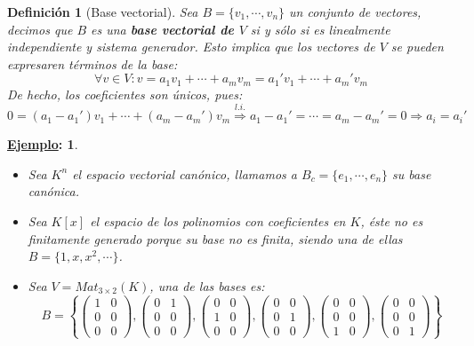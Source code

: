\documentclass[10pt,a4paper,openright]{book}
\theoremstyle{break}
\newtheorem*{defi}{Definición}
\newtheorem*{ej}{\underline{Ejemplo}:}
\begin{document}
\begin{defi}[Base vectorial]
Sea $B=\{v_1, \cdots , v_n\}$  un conjunto de vectores, decimos que $B$ es una \textbf{base vectorial de $V$} si y sólo si es linealmente independiente y sistema generador. Esto implica que los vectores de $V$ se pueden expresaren términos de la base:
$$
\forall v \in V : v=a_1v_1+\cdots+a_mv_m = a_1'v_1+\cdots+a_m'v_m
$$
De hecho, los coeficientes son únicos, pues:
$$
0=(a_1-a_1')v_1+\cdots+(a_m-a_m')v_m\stackrel{l.i.}{\Rightarrow} a_1-a_1'=\cdots=a_m-a_m'=0\Rightarrow a_i=a_i'
$$
\end{defi}

\begin{ej}
\begin{itemize}
\item Sea $K^n$ el espacio vectorial canónico, llamamos a $B_c=\{e_1, \cdots, e_n\}$ su base canónica.

\item Sea $K[x]$ el espacio de los polinomios con coeficientes en $K$, éste no es finitamente generado porque su base no es finita, siendo una de ellas $B=\{1, x, x^2, \cdots\}$. 

\item Sea $V = Mat_{3\times 2}(K)$, una de las bases es:
$$B=\left\lbrace\left(\begin{array}{cc}1 & 0 \\ 0 & 0 \\ 0 & 0 \end{array}\right), \left(\begin{array}{cc}0 & 1 \\ 0 & 0 \\ 0 & 0 \end{array}\right), \left(\begin{array}{cc}0 & 0 \\ 1 & 0 \\ 0 & 0 \end{array}\right), \left(\begin{array}{cc}0 & 0 \\ 0 & 1 \\ 0 & 0 \end{array}\right), \left(\begin{array}{cc}0 & 0 \\ 0 & 0 \\ 1 & 0 \end{array}\right), \left(\begin{array}{cc}0 & 0 \\ 0 & 0 \\ 0 & 1 \end{array}\right)\right\rbrace$$
\end{itemize}
\end{ej}
\end{document}
